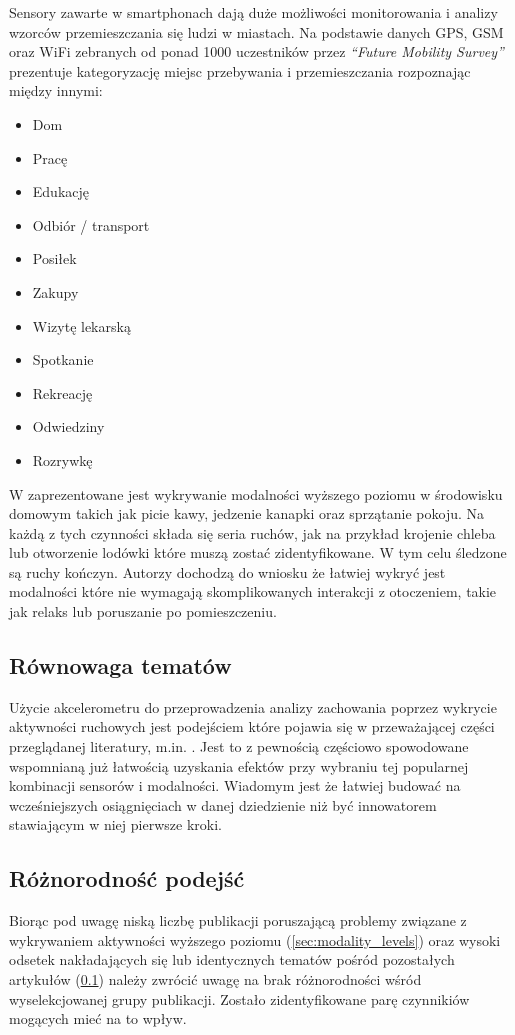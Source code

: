 Sensory zawarte w smartphonach dają duże możliwości monitorowania i analizy wzorców przemieszczania się ludzi w miastach. Na podstawie danych GPS, GSM oraz WiFi zebranych od ponad 1000 uczestników przez \textit{``Future Mobility Survey''} \cite{26_Mobility_Sensing} prezentuje kategoryzację miejsc przebywania i przemieszczania rozpoznając między innymi:
\begin{itemize}
    \item Dom
    \item Pracę
    \item Edukację
    \item Odbiór / transport
    \item Posiłek
    \item Zakupy
    \item Wizytę lekarską
    \item Spotkanie
    \item Rekreację
    \item Odwiedziny
    \item Rozrywkę
\end{itemize}

W \cite{38_High_Lvl_HAR} zaprezentowane jest wykrywanie modalności wyższego poziomu w środowisku domowym takich jak picie kawy, jedzenie kanapki oraz sprzątanie pokoju. Na każdą z tych czynności składa się seria ruchów, jak na przykład krojenie chleba lub otworzenie lodówki które muszą zostać zidentyfikowane. W tym celu śledzone są ruchy kończyn. Autorzy dochodzą do wniosku że łatwiej wykryć jest modalności które nie wymagają skomplikowanych interakcji z otoczeniem, takie jak relaks lub poruszanie po pomieszczeniu.

\subsection{Równowaga tematów}
\label{sec:article_balance}
Użycie akcelerometru do przeprowadzenia analizy zachowania poprzez wykrycie aktywności ruchowych jest podejściem które pojawia się w przeważającej części przeglądanej literatury, m.in. \cite{59_Air_Pressure_HAR, 33_Inertial_Study, 29_Daily_Sport_HAR, 30_Context_Awareness, 32_Accel_Phone_HAR, 42_Micro_AR}. Jest to z pewnością częściowo spowodowane wspomnianą już łatwością uzyskania efektów przy wybraniu tej popularnej kombinacji sensorów i modalności. Wiadomym jest że łatwiej budować na wcześniejszych osiągnięciach w danej dziedzienie niż być innowatorem stawiającym w niej pierwsze kroki. 

\subsection{Różnorodność podejść}
Biorąc pod uwagę niską liczbę publikacji poruszającą problemy związane z wykrywaniem aktywności wyższego poziomu (\ref{sec:modality_levels}) oraz wysoki odsetek nakładających się lub identycznych tematów pośród pozostałych artykułów (\ref{sec:article_balance}) należy zwrócić uwagę na brak różnorodności wśród wyselekcjowanej grupy publikacji. Zostało zidentyfikowane parę czynnikiów mogących mieć na to wpływ. 

